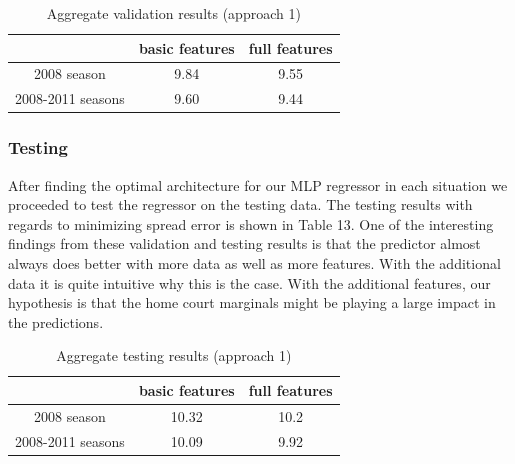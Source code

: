 \documentclass{article}
\begin{document}
\begin{table}
  \begin{center}
    \begin{tabular}{ | c | c | c |}
      \hline
            &            	basic features & 	full features \\ \hline
	2008 season  &     	9.84 & 	9.55    \\ \hline
	2008-2011 seasons &   9.60&  9.44 \\ \hline	

	
    \end{tabular}
  \end{center}
  \caption{Aggregate validation results (approach 1)}
\end{table}

\subsubsection{Testing}
After finding the optimal architecture for our MLP regressor in each situation we proceeded to test the regressor on the testing data. The testing results with regards to minimizing spread error is shown in Table 13. One of the interesting findings from these validation and testing results is that the predictor almost always does better with more data as well as more features. With the additional data it is quite intuitive why this is the case. With the additional features, our hypothesis is that the home court marginals might be playing a large impact in the predictions.  

\begin{table}
  \begin{center}
    \begin{tabular}{ | c | c | c |}
      \hline
            &            	basic features & 	full features \\ \hline
	2008 season  &     	10.32 & 	10.2    \\ \hline
	2008-2011 seasons &  10.09&  9.92 \\ \hline	

	
    \end{tabular}
  \end{center}
  \caption{Aggregate testing results (approach 1)}
\end{table}
\end{document}
